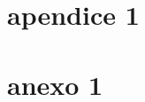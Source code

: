 \documentclass[]{../class/politex}
\begin{document}
  \capa

  \sumario

  

  

  

  \apendice

  \chapter{apendice 1}

  \anexo

  \chapter{anexo 1}
\end{document}

